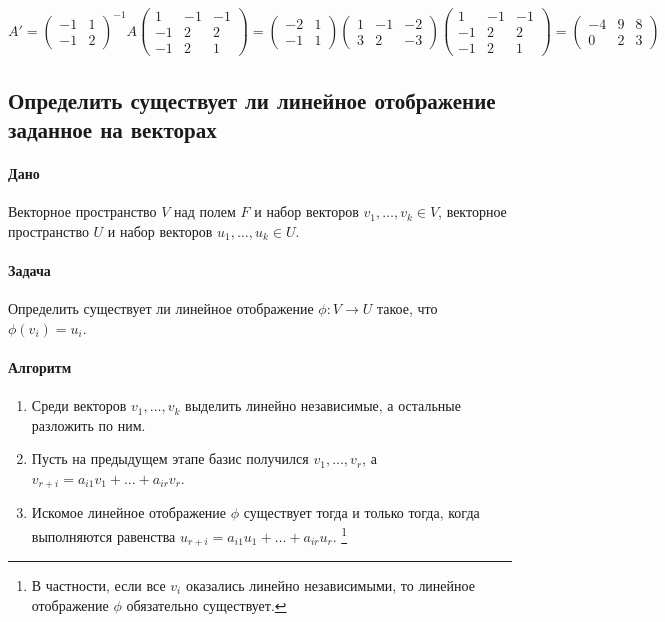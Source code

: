 \documentclass{article}
\begin{document}
\[
A' = 
\begin{pmatrix}
-1&1\\
-1&2
\end{pmatrix}^{-1}
A
\begin{pmatrix}
1&-1&-1\\
-1&2&2\\
-1&2&1
\end{pmatrix}
=
\begin{pmatrix}
-2&1\\
-1&1
\end{pmatrix}
\begin{pmatrix}
1&-1&-2\\
3&2&-3
\end{pmatrix}
\begin{pmatrix}
1&-1&-1\\
-1&2&2\\
-1&2&1
\end{pmatrix}
=
\begin{pmatrix}
-4&9&8\\
0&2&3
\end{pmatrix}
\]

\subsection{Определить существует ли линейное отображение заданное на векторах}

\paragraph{Дано}

Векторное пространство $V$ над полем $F$ и набор векторов $v_1,\ldots,v_k\in V$, векторное пространство $U$ и набор векторов $u_1,\ldots,u_k\in U$.

\paragraph{Задача}

Определить существует ли линейное отображение $\phi\colon V\to U$ такое, что $\phi(v_i) = u_i$.

\paragraph{Алгоритм}

\begin{enumerate}
\item Среди векторов $v_1,\ldots,v_k$ выделить линейно независимые, а остальные разложить по ним.

\item Пусть на предыдущем этапе базис получился $v_1,\ldots,v_r$, а $v_{r + i} = a_{i1} v_1 + \ldots + a_{ir}v_r$.

\item Искомое линейное отображение $\phi$ существует тогда и только тогда, когда выполняются равенства $u_{r+i} = a_{i1}u_1 + \ldots + a_{ir}u_r$.%
\footnote{В частности, если все $v_i$ оказались линейно независимыми, то линейное отображение $\phi$ обязательно существует.}
\end{enumerate}
\end{document}
